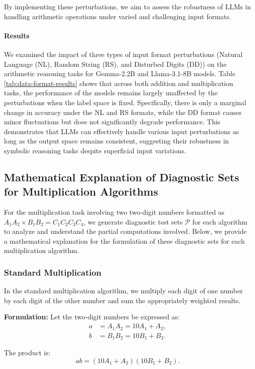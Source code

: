 \documentclass[11pt]{article}
\begin{document}
By implementing these perturbations, we aim to assess the robustness of LLMs in handling arithmetic operations under varied and challenging input formats.


\paragraph{Results}
We examined the impact of three types of input format perturbations (Natural Language (NL), Random String (RS), and Disturbed Digits (DD)) on the arithmetic reasoning tasks for Gemma-2.2B and Llama-3.1-8B models. Table \ref{tab:data-format-results} shows that across both addition and multiplication tasks, the performance of the models remains largely unaffected by the perturbations when the label space is fixed. Specifically, there is only a marginal change in accuracy under the NL and RS formats, while the DD format causes minor fluctuations but does not significantly degrade performance. This demonstrates that LLMs can effectively handle various input perturbations as long as the output space remains consistent, suggesting their robustness in symbolic reasoning tasks despite superficial input variations.
\subsection{Mathematical Explanation of Diagnostic Sets for Multiplication Algorithms}
\label{appendix:diagnostiC_sets}
For the multiplication task involving two two-digit numbers formatted as $A_1A_2 \times B_1B_2 = C_1C_2C_3C_4$, we generate diagnostic test sets $\mathcal{P}$ for each algorithm to analyze and understand the partial computations involved. Below, we provide a mathematical explanation for the formulation of these diagnostic sets for each multiplication algorithm.
\subsubsection{Standard Multiplication}
In the standard multiplication algorithm, we multiply each digit of one number by each digit of the other number and sum the appropriately weighted results.

\textbf{Formulation:}
Let the two-digit numbers be expressed as:
\begin{align*}
a &= A_1A_2 = 10A_1 + A_2, \\
b &= B_1B_2 = 10B_1 + B_2.
\end{align*}

The product is:
\[
ab = (10A_1 + A_2)(10B_1 + B_2).
\]
\end{document}
